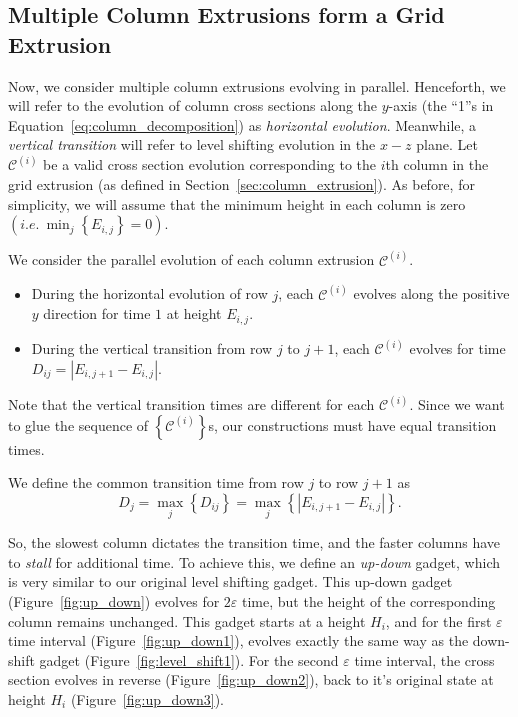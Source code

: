 \subsection{Multiple Column Extrusions form a Grid Extrusion}
\label{sec:grid_extrusion}

Now, we consider multiple column extrusions evolving in parallel.
Henceforth, we will refer to the evolution of column cross sections along the $y$-axis
(the ``1''s in Equation~\ref{eq:column_decomposition}) as \emph{horizontal evolution}.
Meanwhile, a \emph{vertical transition} will refer to level shifting evolution in the $x-z$ plane.
Let $\mathcal C^{(i)}$ be a valid cross section evolution corresponding
to the $i$th column in the grid extrusion (as defined in Section~\ref{sec:column_extrusion}).
As before, for simplicity, we will assume that the minimum height in each column is zero $\left( i.e.\ \min_j\left\{ E_{i,j}\right\} = 0 \right)$.

%

We consider the parallel evolution of each column extrusion $\mathcal C^{(i)}$.
\begin{itemize}
    \item During the horizontal evolution of row $j$, each $\mathcal C^{(i)}$ evolves along the positive $y$ direction for time $1$ at height $E_{i,j}$.
    \item During the vertical transition from row $j$ to $j+1$, each $\mathcal C^{(i)}$ evolves for time $ D_{ij} = \left| E_{i,j+1}-E_{i,j}\right|$.
\end{itemize}
Note that the vertical transition times are different for each $\mathcal C^{(i)}$.
Since we want to glue the sequence of $\left\{ \mathcal C^{(i)}\right\}$s, our constructions must have equal transition times.

\begin{definition}
\label{def:slowest_column}
We define the common transition time from row $j$ to row $j+1$ as
$$D_j = \max_j\left\{ D_{ij}\right\} = \max_j\left\{ \left| E_{i,j+1}-E_{i,j}\right|\right\}.$$
\end{definition}

So, the slowest column dictates the transition time, and the faster columns have to \emph{stall} for additional time.
To achieve this, we define an \emph{up-down} gadget, which is very similar to our original level shifting gadget.
This up-down gadget (Figure~\ref{fig:up_down}) evolves for $2\varepsilon$ time, but the height of the corresponding column remains unchanged.
This gadget starts at a height $H_i$, and for the first $\varepsilon$ time interval (Figure~\ref{fig:up_down1}),
evolves exactly the same way as the down-shift gadget (Figure~\ref{fig:level_shift1}).
For the second $\varepsilon$ time interval, the cross section evolves in reverse (Figure~\ref{fig:up_down2}),
back to it's original state at height $H_i$ (Figure~\ref{fig:up_down3}).

